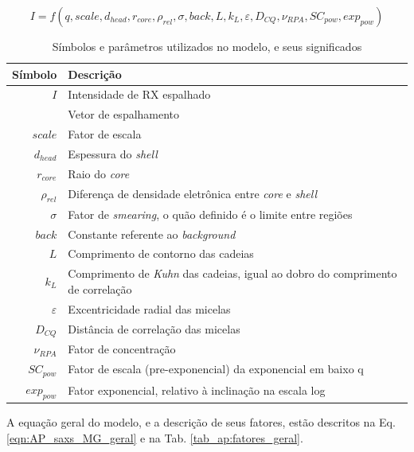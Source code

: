 \begin{apendicesenv}
\begin{equation}
I = f(q, scale, d_{head}, r_{core}, \rho_{rel}, \sigma, back, L, k_L, \varepsilon, D_{CQ}, \nu_{RPA}, SC_{pow}, exp_{pow})
\label{eqn:AP_saxs_MG_superficial}
\end{equation}
\begin{table}
    \IBGEtab%
    {\caption{Símbolos e parâmetros utilizados no modelo, e seus significados}
     \label{tab_ap:simbolos} }%
    {\begin{tabular}{r p{8cm}}
    	\toprule
     Símbolo 			& Descrição        						\\
     \midrule
     \(I\)					& Intensidade de RX espalhado			\\
     \q					& Vetor de espalhamento					\\
     \midrule
     \(scale\)				& Fator de escala						\\
     \(d_{head}\)			& Espessura do \emph{shell}				\\
     \(r_{core}\)			& Raio do \emph{core}					\\
     \(\rho_{rel}\)		& Diferença de densidade eletrônica entre \emph{core} e \emph{shell} \\
     \(\sigma\)			& Fator de \emph{smearing}, o quão definido é o limite entre regiões \\
     \(back\)				& Constante referente ao \emph{background} \\
     \(L\)					& Comprimento de contorno das cadeias 	\\
     \(k_L\)				& Comprimento de \emph{Kuhn} das cadeias, igual ao dobro do comprimento de correlação \\ %
     \(\varepsilon\)			& Excentricidade radial das micelas		\\
     \(D_{CQ}\)			& Distância de correlação das micelas 	\\
     \(\nu_{RPA}\)			& Fator de concentração					\\
     \midrule
     \(SC_{pow}\)			& Fator de escala (pre-exponencial) da exponencial em baixo q\\
     \(exp_{pow}\)			& Fator exponencial, relativo à inclinação na escala log\\
     \bottomrule
    \end{tabular}}%
    {}%
\end{table}

A equação geral do modelo, e a descrição de seus fatores, estão descritos na Eq.\ref{eqn:AP_saxs_MG_geral} e na Tab. \ref{tab_ap:fatores_geral}.


\end{apendicesenv}
